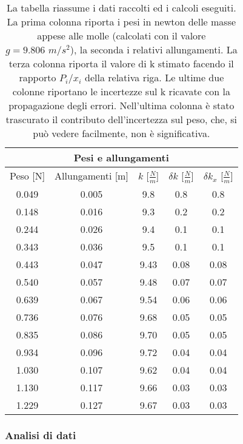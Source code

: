 \begin{SCtable}
    \centering
    \begin{tabular}{c c c c c}
        \multicolumn{5}{c}{\textbf{Pesi e allungamenti}} \\[1mm]
        \toprule
        Peso [N] & Allungamenti [m] & $k$ [$\frac{N}{m}$] & $\delta k$ [$\frac{N}{m}$] & $\delta k_x$ [$\frac{N}{m}$]\\
        \midrule
        0.049 & 0.005 & 9.8 & 0.8 & 0.8 \\
		0.148 & 0.016 & 9.3 & 0.2 & 0.2 \\
		0.244 & 0.026 & 9.4 & 0.1 & 0.1 \\
		0.343 & 0.036 & 9.5 & 0.1 & 0.1 \\
		0.443 & 0.047 & 9.43 & 0.08 & 0.08 \\
		0.540 & 0.057 & 9.48 & 0.07 & 0.07 \\
		0.639 & 0.067 & 9.54 & 0.06 & 0.06 \\
		0.736 & 0.076 & 9.68 & 0.05 & 0.05 \\
		0.835 & 0.086 & 9.70 & 0.05 & 0.05 \\
		0.934 & 0.096 & 9.72 & 0.04 & 0.04 \\
		1.030 & 0.107 & 9.62 & 0.04 & 0.04 \\
		1.130 & 0.117 & 9.66 & 0.03 & 0.03 \\
		1.229 & 0.127 & 9.67 & 0.03 & 0.03 \\
        \bottomrule
    \end{tabular}
    \caption{La tabella riassume i dati raccolti ed i calcoli eseguiti. La prima colonna riporta i pesi in newton
        delle masse appese alle molle (calcolati con il valore $g = 9.806 \,\, m/s^2$), la seconda i relativi allungamenti.
        La terza colonna riporta il valore di k stimato facendo il rapporto $P_i/x_i$ della relativa riga. Le ultime due colonne
        riportano le incertezze sul k ricavate con la propagazione degli errori. Nell'ultima colonna è stato trascurato il contributo
        dell'incertezza sul peso, che, si può vedere facilmente, non è significativa.}
    \label{tab:dati}
\end{SCtable}

\subsubsection{Analisi di dati}


